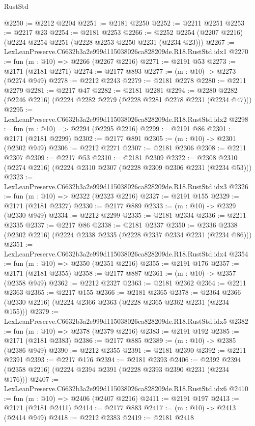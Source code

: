 \begin{lexlean}{RustStd}
\begin{coremodule}
@2250 := @2212 @2204
@2251 := @2181 @2250
@2252 := @2211 @2251
@2253 := @2217 @23
@2254 := @2181 @2253
@2266 := @2252 @2254 (@2207 @2216) (@2224 @2254 @2251 (@2228 @2253 @2250 @2231 (@2234 @23)))
@2267 := LexLeanPreserve.C6632b3a2e999d115038026ca828209de.R18.RustStd.idx1
@2270 := fun (m : @10) => @2266 (@2267 @2216)
@2271 := @2191 @53
@2273 := @2171 (@2181 @2271)
@2274 := @2177 @893
@2277 := (m : @10) -> @2273 (@2274 @949)
@2278 := @2212 @2243
@2279 := @2181 @2278
@2280 := @2211 @2279
@2281 := @2217 @47
@2282 := @2181 @2281
@2294 := @2280 @2282 (@2246 @2216) (@2224 @2282 @2279 (@2228 @2281 @2278 @2231 (@2234 @47)))
@2295 := LexLeanPreserve.C6632b3a2e999d115038026ca828209de.R18.RustStd.idx2
@2298 := fun (m : @10) => @2294 (@2295 @2216)
@2299 := @2191 @86
@2301 := @2171 (@2181 @2299)
@2302 := @2177 @891
@2305 := (m : @10) -> @2301 (@2302 @949)
@2306 := @2212 @2271
@2307 := @2181 @2306
@2308 := @2211 @2307
@2309 := @2217 @53
@2310 := @2181 @2309
@2322 := @2308 @2310 (@2274 @2216) (@2224 @2310 @2307 (@2228 @2309 @2306 @2231 (@2234 @53)))
@2323 := LexLeanPreserve.C6632b3a2e999d115038026ca828209de.R18.RustStd.idx3
@2326 := fun (m : @10) => @2322 (@2323 @2216)
@2327 := @2191 @155
@2329 := @2171 (@2181 @2327)
@2330 := @2177 @889
@2333 := (m : @10) -> @2329 (@2330 @949)
@2334 := @2212 @2299
@2335 := @2181 @2334
@2336 := @2211 @2335
@2337 := @2217 @86
@2338 := @2181 @2337
@2350 := @2336 @2338 (@2302 @2216) (@2224 @2338 @2335 (@2228 @2337 @2334 @2231 (@2234 @86)))
@2351 := LexLeanPreserve.C6632b3a2e999d115038026ca828209de.R18.RustStd.idx4
@2354 := fun (m : @10) => @2350 (@2351 @2216)
@2355 := @2191 @176
@2357 := @2171 (@2181 @2355)
@2358 := @2177 @887
@2361 := (m : @10) -> @2357 (@2358 @949)
@2362 := @2212 @2327
@2363 := @2181 @2362
@2364 := @2211 @2363
@2365 := @2217 @155
@2366 := @2181 @2365
@2378 := @2364 @2366 (@2330 @2216) (@2224 @2366 @2363 (@2228 @2365 @2362 @2231 (@2234 @155)))
@2379 := LexLeanPreserve.C6632b3a2e999d115038026ca828209de.R18.RustStd.idx5
@2382 := fun (m : @10) => @2378 (@2379 @2216)
@2383 := @2191 @192
@2385 := @2171 (@2181 @2383)
@2386 := @2177 @885
@2389 := (m : @10) -> @2385 (@2386 @949)
@2390 := @2212 @2355
@2391 := @2181 @2390
@2392 := @2211 @2391
@2393 := @2217 @176
@2394 := @2181 @2393
@2406 := @2392 @2394 (@2358 @2216) (@2224 @2394 @2391 (@2228 @2393 @2390 @2231 (@2234 @176)))
@2407 := LexLeanPreserve.C6632b3a2e999d115038026ca828209de.R18.RustStd.idx6
@2410 := fun (m : @10) => @2406 (@2407 @2216)
@2411 := @2191 @197
@2413 := @2171 (@2181 @2411)
@2414 := @2177 @883
@2417 := (m : @10) -> @2413 (@2414 @949)
@2418 := @2212 @2383
@2419 := @2181 @2418

\end{coremodule}
\end{lexlean}
